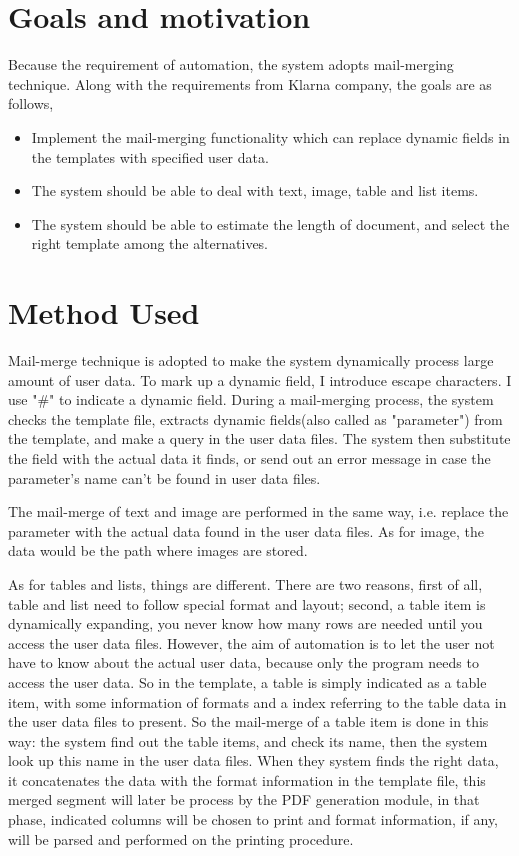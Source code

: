 \documentclass{report}
\begin{document}
\section{Goals and motivation}

  Because the requirement of automation, the system adopts mail-merging technique. Along with the requirements from Klarna company, the goals are as follows,

\begin{itemize}
\item Implement the mail-merging functionality which can replace dynamic fields in the templates with specified user data.
\item The system should be able to deal with text, image, table and list items.
\item The system should be able to estimate the length of document, and select the right template among the alternatives.
\end{itemize}

\section{Method Used}
  Mail-merge technique is adopted to make the system dynamically process large amount of user data. To mark up a dynamic field, I introduce escape characters. I use "\#" to indicate a dynamic field. During a mail-merging process, the system checks the template file, extracts dynamic fields(also called as "parameter") from the template, and make a query in the user data files. The system then substitute the field with the actual data it finds, or send out an error message in case the parameter's name can't be found in user data files. 

  The mail-merge of text and image are performed in the same way, i.e. replace the parameter with the actual data found in the user data files. As for image, the data would be the path where images are stored.

  As for tables and lists, things are different. There are two reasons, first of all, table and list need to follow special format and layout; second, a table item is dynamically expanding, you never know how many rows are needed until you access the user data files. However, the aim of automation is to let the user not have to know about the actual user data, because only the program needs to access the user data. So in the template, a table is simply indicated as a table item, with some information of formats and a index referring to the table data in the user data files to present. So the mail-merge of a table item is done in this way: the system find out the table items, and check its name, then the system look up this name in the user data files. When they system finds the right data, it concatenates the data with the format information in the template file, this merged segment will later be process by the PDF generation module, in that phase, indicated columns will be chosen to print and format information, if any, will be parsed and performed on the printing procedure.
\end{document}

